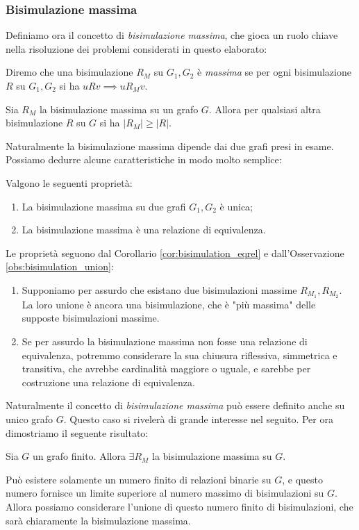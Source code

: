 \subsubsection{Bisimulazione massima}
\label{sec:bisi_max}
Definiamo ora il concetto di \emph{bisimulazione massima}, che gioca un ruolo chiave nella risoluzione dei problemi considerati in questo elaborato:
\begin{definition}
    Diremo che una bisimulazione $R_M$ su $G_1, G_2$ è \emph{massima} se per ogni bisimulazione $R$ su $G_1,G_2$ si ha $u R v \implies u R_M v$.
\end{definition}
\begin{observation}
    Sia $R_M$ la bisimulazione massima su un grafo $G$. Allora per qualsiasi altra bisimulazione $R$ su $G$ si ha $|R_M| \geq |R|$.
\end{observation}
Naturalmente la bisimulazione massima dipende dai due grafi presi in esame. Possiamo dedurre alcune caratteristiche in modo molto semplice:
\begin{proposition}
    Valgono le seguenti proprietà:
    \begin{enumerate}
        \item La bisimulazione massima su due grafi $G_1,G_2$ è unica;
        \item La bisimulazione massima è una relazione di equivalenza.
    \end{enumerate}
    \label{prop:bisi_max_equi}
\end{proposition}
\begin{proof2}
    Le proprietà seguono dal Corollario \ref{cor:bisimulation_eqrel} e dall'Osservazione \ref{obs:bisimulation_union}:
    \begin{enumerate}
        \item Supponiamo per assurdo che esistano due bisimulazioni massime $R_{M_1}, R_{M_2}$. La loro unione è ancora una bisimulazione, che è "più massima" delle supposte bisimulazioni massime.
        \item Se per assurdo la bisimulazione massima non fosse una relazione di equivalenza, potremmo considerare la sua chiusura riflessiva, simmetrica e transitiva, che avrebbe cardinalità maggiore o uguale, e sarebbe per costruzione una relazione di equivalenza.
    \end{enumerate}
\end{proof2}
Naturalmente il concetto di \emph{bisimulazione massima} può essere definito anche su unico grafo $G$. Questo caso si rivelerà di grande interesse nel seguito. Per
ora dimostriamo il seguente risultato:
\begin{theorem}
    Sia $G$ un grafo finito. Allora $\exists R_M$ la bisimulazione massima su $G$.
\end{theorem}
\begin{proof2}
    Può esistere solamente un numero finito di relazioni binarie su $G$, e questo numero fornisce un limite superiore al numero massimo di bisimulazioni su $G$.
    Allora possiamo considerare l'unione di questo numero finito di bisimulazioni, che sarà chiaramente la bisimulazione massima.
\end{proof2}

